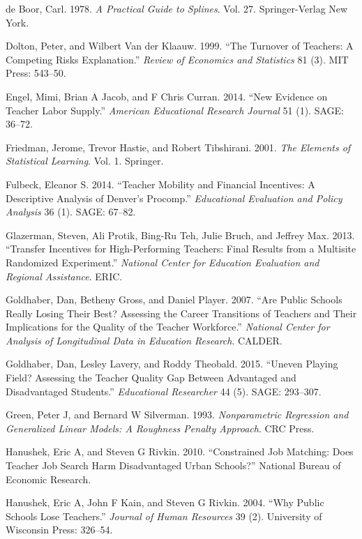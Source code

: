 \documentclass[12pt,]{article}
\begin{document}
\hypertarget{ref-deboor}{}
de Boor, Carl. 1978. \emph{A Practical Guide to Splines}. Vol. 27.
Springer-Verlag New York.

\hypertarget{ref-dolton}{}
Dolton, Peter, and Wilbert Van der Klaauw. 1999. ``The Turnover of
Teachers: A Competing Risks Explanation.'' \emph{Review of Economics and
Statistics} 81 (3). MIT Press: 543--50.

\hypertarget{ref-engel}{}
Engel, Mimi, Brian A Jacob, and F Chris Curran. 2014. ``New Evidence on
Teacher Labor Supply.'' \emph{American Educational Research Journal} 51
(1). SAGE: 36--72.

\hypertarget{ref-friedman}{}
Friedman, Jerome, Trevor Hastie, and Robert Tibshirani. 2001. \emph{The
Elements of Statistical Learning}. Vol. 1. Springer.

\hypertarget{ref-fulbeck}{}
Fulbeck, Eleanor S. 2014. ``Teacher Mobility and Financial Incentives: A
Descriptive Analysis of Denver's Procomp.'' \emph{Educational Evaluation
and Policy Analysis} 36 (1). SAGE: 67--82.

\hypertarget{ref-glazerman}{}
Glazerman, Steven, Ali Protik, Bing-Ru Teh, Julie Bruch, and Jeffrey
Max. 2013. ``Transfer Incentives for High-Performing Teachers: Final
Results from a Multisite Randomized Experiment.'' \emph{National Center
for Education Evaluation and Regional Assistance}. ERIC.

\hypertarget{ref-goldhaber2007}{}
Goldhaber, Dan, Betheny Gross, and Daniel Player. 2007. ``Are Public
Schools Really Losing Their Best? Assessing the Career Transitions of
Teachers and Their Implications for the Quality of the Teacher
Workforce.'' \emph{National Center for Analysis of Longitudinal Data in
Education Research}. CALDER.

\hypertarget{ref-goldhaber2015}{}
Goldhaber, Dan, Lesley Lavery, and Roddy Theobald. 2015. ``Uneven
Playing Field? Assessing the Teacher Quality Gap Between Advantaged and
Disadvantaged Students.'' \emph{Educational Researcher} 44 (5). SAGE:
293--307.

\hypertarget{ref-green}{}
Green, Peter J, and Bernard W Silverman. 1993. \emph{Nonparametric
Regression and Generalized Linear Models: A Roughness Penalty Approach}.
CRC Press.

\hypertarget{ref-hanushek2010}{}
Hanushek, Eric A, and Steven G Rivkin. 2010. ``Constrained Job Matching:
Does Teacher Job Search Harm Disadvantaged Urban Schools?'' National
Bureau of Economic Research.

\hypertarget{ref-hanushek}{}
Hanushek, Eric A, John F Kain, and Steven G Rivkin. 2004. ``Why Public
Schools Lose Teachers.'' \emph{Journal of Human Resources} 39 (2).
University of Wisconsin Press: 326--54.
\end{document}
